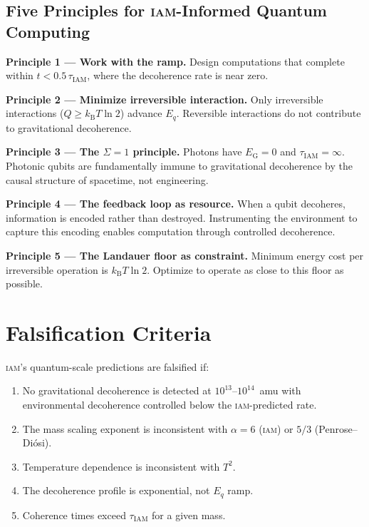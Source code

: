\documentclass[12pt,letterpaper]{article}
\newcommand{\IAM}{\textsc{iam}}
\newcommand{\kB}{k_{\mathrm{B}}}
\newcommand{\EG}{E_{\mathrm{G}}}
\newcommand{\tauIAM}{\tau_{\mathrm{IAM}}}
\begin{document}
\subsection{Five Principles for \IAM-Informed Quantum Computing}

\textbf{Principle 1 --- Work with the ramp.} Design computations that
complete within $t < 0.5\,\tauIAM$, where the decoherence rate is near zero.

\textbf{Principle 2 --- Minimize irreversible interaction.} Only irreversible
interactions ($Q \geq \kB T \ln 2$) advance $E_q$. Reversible interactions
do not contribute to gravitational decoherence.

\textbf{Principle 3 --- The $\Sigma = 1$ principle.} Photons have $\EG = 0$
and $\tauIAM = \infty$. Photonic qubits are fundamentally immune to
gravitational decoherence by the causal structure of spacetime, not
engineering.

\textbf{Principle 4 --- The feedback loop as resource.} When a qubit
decoheres, information is encoded rather than destroyed. Instrumenting the
environment to capture this encoding enables computation through controlled
decoherence.

\textbf{Principle 5 --- The Landauer floor as constraint.} Minimum energy
cost per irreversible operation is $\kB T \ln 2$. Optimize to operate as
close to this floor as possible.

\section{Falsification Criteria}

\IAM's quantum-scale predictions are falsified if:

\begin{enumerate}
\item No gravitational decoherence is detected at $10^{13}$--$10^{14}$~amu
with environmental decoherence controlled below the \IAM-predicted rate.

\item The mass scaling exponent is inconsistent with $\alpha = 6$ (\IAM)
or $5/3$ (Penrose--Di\'{o}si).

\item Temperature dependence is inconsistent with $T^2$.

\item The decoherence profile is exponential, not $E_q$ ramp.

\item Coherence times exceed $\tauIAM$ for a given mass.
\end{enumerate}
\end{document}
